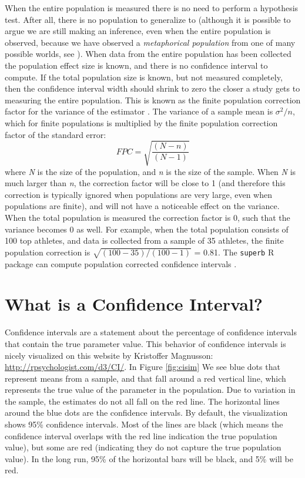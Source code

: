 \documentclass[
  oneside]{book}
\begin{document}
When the entire population is measured there is no need to perform a hypothesis test. After all, there is no population to generalize to (although it is possible to argue we are still making an inference, even when the entire population is observed, because we have observed a \emph{metaphorical population} from one of many possible worlds, see \citet{spiegelhalter_art_2019}). When data from the entire population has been collected the population effect size is known, and there is no confidence interval to compute. If the total population size is known, but not measured completely, then the confidence interval width should shrink to zero the closer a study gets to measuring the entire population. This is known as the finite population correction factor for the variance of the estimator \citep{kish_survey_1965}. The variance of a sample mean is \(\sigma^2/n\), which for finite populations is multiplied by the finite population correction factor of the standard error:
\[FPC = \sqrt{\frac{(N - n)}{(N-1)}}\]
where \emph{N} is the size of the population, and \emph{n} is the size of the sample. When \emph{N} is much larger than \emph{n}, the correction factor will be close to 1 (and therefore this correction is typically ignored when populations are very large, even when populations are finite), and will not have a noticeable effect on the variance. When the total population is measured the correction factor is 0, such that the variance becomes 0 as well. For example, when the total population consists of 100 top athletes, and data is collected from a sample of 35 athletes, the finite population correction is \(\sqrt{(100 - 35)/(100-1)}\) = 0.81. The \texttt{superb} R package can compute population corrected confidence intervals \citep{cousineau_superb_2019}.

\hypertarget{what-is-a-confidence-interval}{%
\section{What is a Confidence Interval?}\label{what-is-a-confidence-interval}}

Confidence intervals are a statement about the percentage of confidence intervals that contain the true parameter value. This behavior of confidence intervals is nicely visualized on this website by Kristoffer Magnusson: \url{http://rpsychologist.com/d3/CI/}. In Figure \ref{fig:cisim} We see blue dots that represent means from a sample, and that fall around a red vertical line, which represents the true value of the parameter in the population. Due to variation in the sample, the estimates do not all fall on the red line. The horizontal lines around the blue dots are the confidence intervals. By default, the visualization shows 95\% confidence intervals. Most of the lines are black (which means the confidence interval overlaps with the red line indication the true population value), but some are red (indicating they do not capture the true population value). In the long run, 95\% of the horizontal bars will be black, and 5\% will be red.
\end{document}
